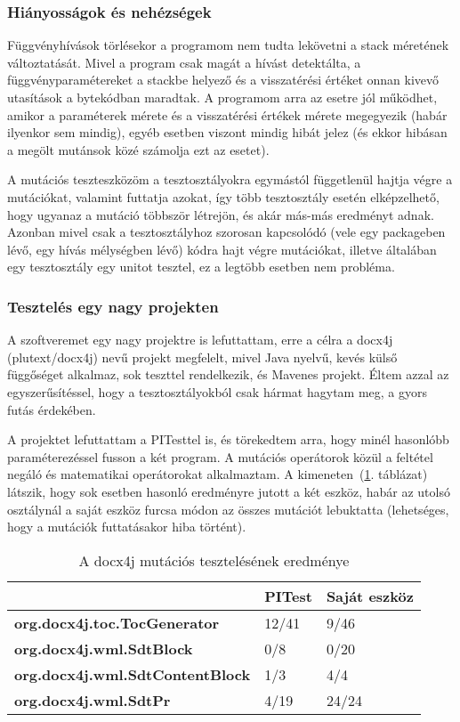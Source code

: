 \subsubsection{Hiányosságok és nehézségek}
Függvényhívások törlésekor a programom nem tudta lekövetni a stack méretének változtatását. Mivel a program csak magát a hívást detektálta, a függvényparamétereket a stackbe helyező és a visszatérési értéket onnan kivevő utasítások a bytekódban maradtak. A programom arra az esetre jól működhet, amikor a paraméterek mérete és a visszatérési értékek mérete megegyezik (habár ilyenkor sem mindig), egyéb esetben viszont mindig hibát jelez (és ekkor hibásan a megölt mutánsok közé számolja ezt az esetet).

A mutációs teszteszközöm a tesztosztályokra egymástól függetlenül hajtja végre a mutációkat, valamint futtatja azokat, így több tesztosztály esetén elképzelhető, hogy ugyanaz a mutáció többször létrejön, és akár más-más eredményt adnak. Azonban mivel csak a tesztosztályhoz szorosan kapcsolódó (vele egy packageben lévő, egy hívás mélységben lévő) kódra hajt végre mutációkat, illetve általában egy tesztosztály egy unitot tesztel, ez a legtöbb esetben nem probléma.
\subsubsection{Tesztelés egy nagy projekten}
A szoftveremet egy nagy projektre is lefuttattam, erre a célra a docx4j (plutext/docx4j) nevű projekt megfelelt, mivel Java nyelvű, kevés külső függőséget alkalmaz, sok teszttel rendelkezik, és Mavenes projekt. Éltem azzal az egyszerűsítéssel, hogy a tesztosztályokból csak hármat hagytam meg, a gyors futás érdekében. 

A projektet lefuttattam a PITesttel is, és törekedtem arra, hogy minél hasonlóbb paraméterezéssel fusson a két program. A mutációs operátorok közül a feltétel negáló és matematikai operátorokat alkalmaztam. A kimeneten~(\ref{resultstable}. táblázat) látszik, hogy sok esetben hasonló eredményre jutott a két eszköz, habár az utolsó osztálynál a saját eszköz furcsa módon az összes mutációt lebuktatta (lehetséges, hogy a mutációk futtatásakor hiba történt).

\begin{table}[]
\centering
\def\arraystretch{1.5}
\begin{tabular}{|l|l|l|}
\hline
                                        & \textbf{PITest} & \textbf{Saját eszköz} \\ \hline
\textbf{org.docx4j.toc.TocGenerator}    & 12/41           & 9/46                  \\ \hline
\textbf{org.docx4j.wml.SdtBlock}        & 0/8             & 0/20                  \\ \hline
\textbf{org.docx4j.wml.SdtContentBlock} & 1/3             & 4/4                   \\ \hline
\textbf{org.docx4j.wml.SdtPr}           & 4/19            & 24/24                 \\ \hline
\end{tabular}
\caption{A docx4j mutációs tesztelésének eredménye}
\label{resultstable}
\end{table}

